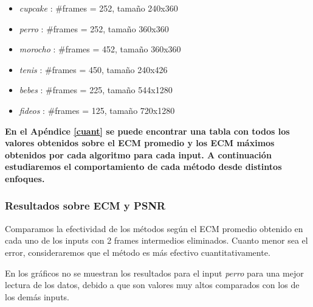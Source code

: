 \begin{multicols}{2}
\begin{itemize}
\item \textit{cupcake} : $\#$frames = 252, tamaño 240x360
\item \textit{perro} : $\#$frames = 252, tamaño 360x360
\item \textit{morocho} : $\#$frames = 452, tamaño 360x360
\item \textit{tenis} : $\#$frames = 450, tamaño 240x426
\item \textit{bebes} : $\#$frames = 225, tamaño 544x1280
\item \textit{fideos} : $\#$frames = 125, tamaño 720x1280
\end{itemize}
\end{multicols}


\newpage
\par  \textbf{En el Apéndice \ref{cuant} se puede encontrar una tabla con todos los valores obtenidos sobre el ECM promedio y los ECM máximos obtenidos por cada algoritmo para cada input. A continuación estudiaremos el comportamiento de cada método desde distintos enfoques.}

\subsubsection{Resultados sobre ECM y PSNR}


\par Comparamos la efectividad de los métodos según el ECM promedio obtenido en cada uno de los inputs con 2 frames intermedios eliminados. Cuanto menor sea el error, consideraremos que el método es más efectivo cuantitativamente. 
\par En los gráficos no se muestran los resultados para el input \textit{perro} para una mejor lectura de los datos, debido a que son valores muy altos comparados con los de los demás inputs. 

\begin{figure}[ht]
	\begin{center}
	\end{center}
\end{figure}

